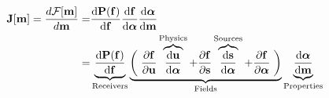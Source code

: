 \begin{equation}
\begin{aligned}
\mathbf{J}[\mathbf{m}] = \frac{d \mathcal{F}[\mathbf{m}]}{ d \mathbf{m}} = &
    \frac{\text{d}\mathbf{P}(\mathbf{f})}{\text{d}\mathbf{f}}
    \frac{\text{d}\mathbf{f}}{\text{d}\boldsymbol{\alpha}}
    \frac{\text{d}\boldsymbol{\alpha}}{\text{d}\mathbf{m}} \\
= &
    \underbrace{
    \frac{\text{d}\mathbf{P}(\mathbf{f})}{\text{d}\mathbf{f}}
    }_{\text{Receivers}}
    \underbrace{
    \left(\vphantom{\frac{\partial\mathbf{f}}{\partial\mathbf{u}}} \right.
\frac{\partial\mathbf{f}}{\partial\mathbf{u}} \overbrace{\frac{\text{d}\mathbf{u}}{\text{d}\boldsymbol{\alpha}}}^{\text{Physics}}
        + \frac{\partial\mathbf{f}}{\partial\mathbf{s}} \overbrace{\frac{\text{d}\mathbf{s}}{\text{d}\boldsymbol{\alpha}}}^{\text{Sources}}
        + \frac{\partial\mathbf{f}}{\partial\boldsymbol{\alpha}}
    \left. \vphantom{\frac{\partial\mathbf{f}}{\partial\mathbf{u}}}\right)
     }_{\text{Fields}}
    \underbrace{\frac{\text{d}\boldsymbol{\alpha}}{\text{d}\mathbf{m}}}_{\text{Properties}}
    \label{eq:generalsensitivity}
\end{aligned}
\end{equation}
